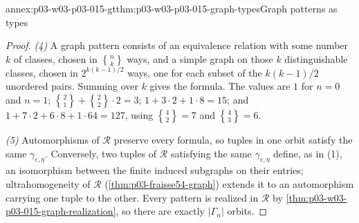 \begin{annexitem}{annex:p03-w03-p03-015-gt}{thm:p03-w03-p03-015-graph-types}{Graph patterns as types}
\begin{proof}
\emph{(4)} A graph pattern consists of an equivalence relation with some
number \(k\) of classes, chosen in \({n\brace k}\) ways, and a simple
graph on those \(k\) distinguishable classes, chosen in
\(2^{k(k-1)/2}\) ways, one for each subset of the \(k(k-1)/2\) unordered
pairs. Summing over \(k\) gives the formula. The values are
\(1\) for \(n=0\) and \(n=1\); \({2\brace1}+{2\brace2}\cdot2=3\);
\(1+3\cdot2+1\cdot8=15\); and \(1+7\cdot2+6\cdot8+1\cdot64=127\),
using \({4\brace2}=7\) and \({4\brace3}=6\).

\emph{(5)} Automorphisms of \(\mathcal R\) preserve every formula, so
tuples in one orbit satisfy the same \(\gamma_{\varepsilon,\eta}\).
Conversely, two tuples of \(\mathcal R\) satisfying the same
\(\gamma_{\varepsilon,\eta}\) define, as in (1), an isomorphism between
the finite induced subgraphs on their entries; ultrahomogeneity of
\(\mathcal R\) (\cref{thm:p03-fraisse54-graph}) extends it to an
automorphism carrying one tuple to the other. Every pattern is realized in
\(\mathcal R\) by \cref{thm:p03-w03-p03-015-graph-realization}, so there
are exactly \(|\Gamma_n|\) orbits.
\end{proof}
\end{annexitem}

